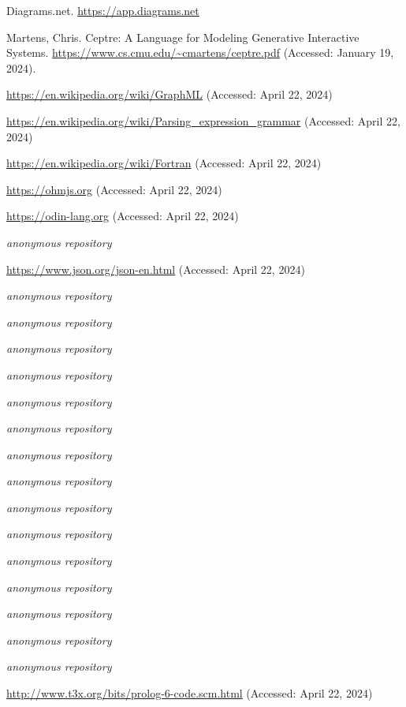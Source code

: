 \documentclass[10pt,anonymous,review]{acmart}
\begin{document}
\begin{thebibliography}{9}

Diagrams.net.
\url{https://app.diagrams.net}

Martens, Chris. Ceptre: A Language for Modeling Generative Interactive Systems. \url{https://www.cs.cmu.edu/~cmartens/ceptre.pdf} (Accessed: January 19, 2024).

\url{https://en.wikipedia.org/wiki/GraphML} (Accessed: April 22, 2024)

\url{https://en.wikipedia.org/wiki/Parsing_expression_grammar} (Accessed: April 22, 2024)

\url{https://en.wikipedia.org/wiki/Fortran} (Accessed: April 22, 2024)

\url{https://ohmjs.org} (Accessed: April 22, 2024)

\url{https://odin-lang.org} (Accessed: April 22, 2024)

\emph{anonymous repository}

\url{https://www.json.org/json-en.html} (Accessed: April 22, 2024)

\emph{anonymous repository}

\emph{anonymous repository}

\emph{anonymous repository}

\emph{anonymous repository}

\emph{anonymous repository}

\emph{anonymous repository}

\emph{anonymous repository}

\emph{anonymous repository}

\emph{anonymous repository}

\emph{anonymous repository}

\emph{anonymous repository}

\emph{anonymous repository}

\emph{anonymous repository}

\emph{anonymous repository}

\emph{anonymous repository}

\url{http://www.t3x.org/bits/prolog-6-code.scm.html} (Accessed: April 22, 2024)

\end{thebibliography}
\end{document}

